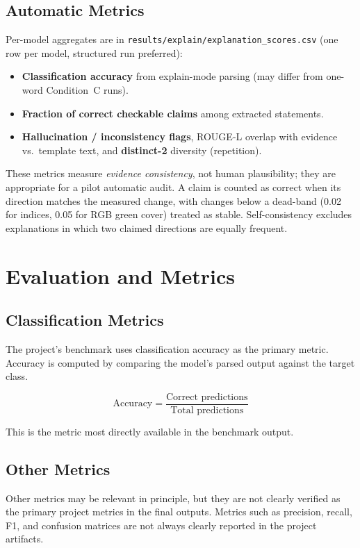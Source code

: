 \documentclass[11pt]{article}
\begin{document}
\subsection{Automatic Metrics}
Per-model aggregates are in \texttt{results/explain/explanation\_scores.csv} (one row per model, structured run preferred):
\begin{itemize}
    \item \textbf{Classification accuracy} from explain-mode parsing (may differ from one-word Condition~C runs).
    \item \textbf{Fraction of correct checkable claims} among extracted statements.
    \item \textbf{Hallucination / inconsistency flags}, ROUGE-L overlap with evidence vs.\ template text, and \textbf{distinct-2} diversity (repetition).
\end{itemize}
These metrics measure \emph{evidence consistency}, not human plausibility; they are appropriate for a pilot automatic audit. A claim is counted as correct when its direction matches the measured change, with changes below a dead-band (0.02 for indices, 0.05 for RGB green cover) treated as stable. Self-consistency excludes explanations in which two claimed directions are equally frequent.

\section{Evaluation and Metrics}

\subsection{Classification Metrics}
The project’s benchmark uses classification accuracy as the primary metric. Accuracy is computed by comparing the model’s parsed output against the target class.

\[
\text{Accuracy} = \frac{\text{Correct predictions}}{\text{Total predictions}}
\]

This is the metric most directly available in the benchmark output.

\subsection{Other Metrics}
Other metrics may be relevant in principle, but they are not clearly verified as the primary project metrics in the final outputs. Metrics such as precision, recall, F1, and confusion matrices are not always clearly reported in the project artifacts.
\end{document}
